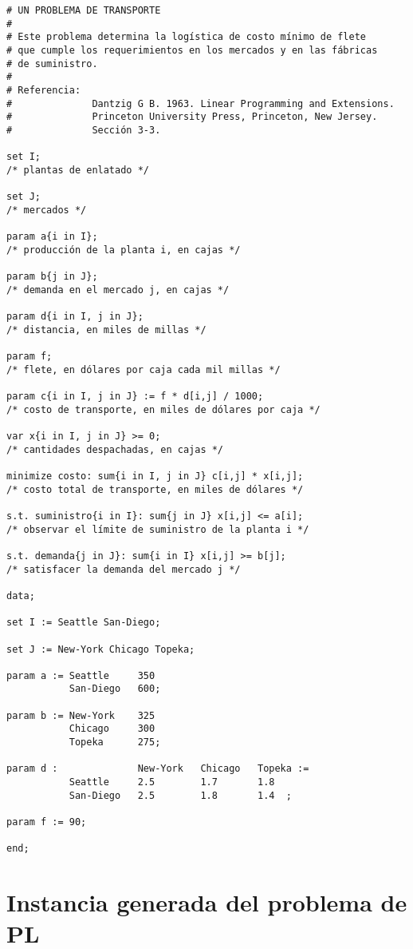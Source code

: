 \documentclass[11pt,spanish]{report}
\begin{document}
\begin{verbatim}
# UN PROBLEMA DE TRANSPORTE
#
# Este problema determina la logística de costo mínimo de flete
# que cumple los requerimientos en los mercados y en las fábricas
# de suministro.
#
# Referencia:
#              Dantzig G B. 1963. Linear Programming and Extensions.
#              Princeton University Press, Princeton, New Jersey.
#              Sección 3-3.

set I;
/* plantas de enlatado */

set J;
/* mercados */

param a{i in I};
/* producción de la planta i, en cajas */

param b{j in J};
/* demanda en el mercado j, en cajas */

param d{i in I, j in J};
/* distancia, en miles de millas */

param f;
/* flete, en dólares por caja cada mil millas */

param c{i in I, j in J} := f * d[i,j] / 1000;
/* costo de transporte, en miles de dólares por caja */

var x{i in I, j in J} >= 0;
/* cantidades despachadas, en cajas */

minimize costo: sum{i in I, j in J} c[i,j] * x[i,j];
/* costo total de transporte, en miles de dólares */

s.t. suministro{i in I}: sum{j in J} x[i,j] <= a[i];
/* observar el límite de suministro de la planta i */

s.t. demanda{j in J}: sum{i in I} x[i,j] >= b[j];
/* satisfacer la demanda del mercado j */

data;

set I := Seattle San-Diego;

set J := New-York Chicago Topeka;

param a := Seattle     350
           San-Diego   600;

param b := New-York    325
           Chicago     300
           Topeka      275;

param d :              New-York   Chicago   Topeka :=
           Seattle     2.5        1.7       1.8
           San-Diego   2.5        1.8       1.4  ;

param f := 90;

end;
\end{verbatim}


\section{Instancia generada del problema de PL}
\end{document}
